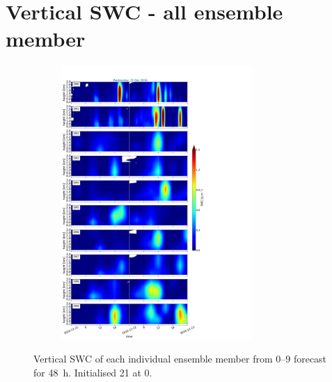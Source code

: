 
\section{Vertical SWC - all ensemble member}%
\label{app:vert_ensmemb09}

\begin{figure}[h]%
	\centering
	\begin{subfigure}[t]{\textwidth} 
		\centering
		\includegraphics[trim={0cm 0cm 18.3cm 5.1cm},clip,width=0.8\textwidth]{./fig_09EM/20161221}
		\caption{}\label{fig:EM09_21}
	\end{subfigure}
    \caption{Vertical SWC of each individual ensemble member from \numrange{0}{9} forecast for \SI{48}{\hour}. Initialised \SI{21}{\dec} at \SI{0}{\UTC}.}\label{fig:EM09}
\end{figure}
